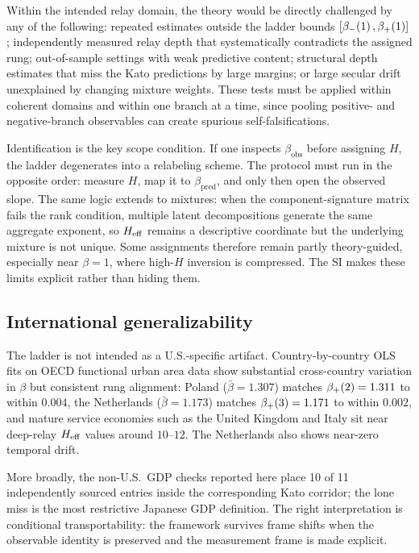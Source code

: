 Within the intended relay domain, the theory would be directly challenged by
any of the following: repeated estimates outside the ladder bounds
$[\beta_-\!\left(1\right),\beta_+\!\left(1\right)]$; independently measured relay depth that
systematically contradicts the assigned rung; out-of-sample settings with weak
predictive content; structural depth estimates that miss the Kato predictions
by large margins; or large secular drift unexplained by changing mixture
weights. These tests must be applied within coherent domains and within one
branch at a time, since pooling positive- and negative-branch observables can
create spurious self-falsifications.

Identification is the key scope condition. If one inspects
$\beta_{\mathrm{obs}}$ before assigning $H$, the ladder degenerates into a
relabeling scheme. The protocol must run in the opposite order: measure
$H$, map it to $\beta_{\mathrm{pred}}$, and only then open the observed
slope. The same logic extends to mixtures: when the component-signature matrix
fails the rank condition, multiple latent decompositions generate the same
aggregate exponent, so $H_{\mathrm{eff}}$ remains a descriptive coordinate but the
underlying mixture is not unique. Some assignments therefore remain partly
theory-guided, especially near $\beta=1$, where high-$H$ inversion is
compressed. The SI makes these limits explicit rather than hiding them.

\subsection{International generalizability}
The ladder is not intended as a U.S.-specific artifact. Country-by-country OLS
fits on OECD functional urban area data show substantial cross-country
variation in $\beta$ but consistent rung alignment: Poland
($\bar\beta=1.307$) matches $\beta_+\!\left(2\right)=1.311$ to within $0.004$, the
Netherlands ($\bar\beta=1.173$) matches $\beta_+\!\left(3\right)=1.171$ to within
$0.002$, and mature service economies such as the United Kingdom and Italy
sit near deep-relay $H_{\mathrm{eff}}$ values around $10$--$12$. The Netherlands
also shows near-zero temporal drift.

More broadly, the non-U.S.\ GDP checks reported here place 10 of 11
independently sourced entries inside the corresponding Kato corridor; the lone
miss is the most restrictive Japanese GDP definition. The right interpretation
is conditional transportability: the framework survives frame shifts when the
observable identity is preserved and the measurement frame is made explicit.

